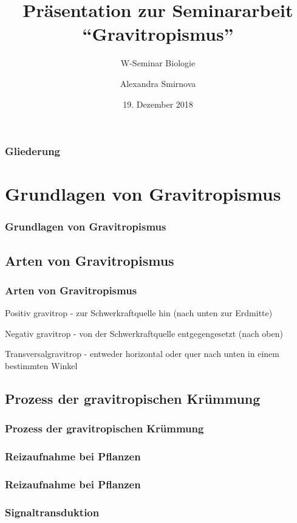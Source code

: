 \documentclass[aspectratio=169]{beamer}
\author{Alexandra Smirnova}
\title{Präsentation zur Seminararbeit \hyphenquote{ngerman}{Gravitropismus}}
\subtitle{W-Seminar Biologie}
\date{19. Dezember 2018}
\begin{document}
	\maketitle
	
	\begin{frame}
		\frametitle{Gliederung}
		\tableofcontents
	\end{frame}
	
	\section{Grundlagen von Gravitropismus}

	
	\begin{frame}
		\frametitle{Grundlagen von Gravitropismus}
	\end{frame}
	
	\subsection{Arten von Gravitropismus}
	
	\begin{frame}
		\frametitle{Arten von Gravitropismus}
		Positiv gravitrop - zur Schwerkraftquelle hin (nach unten zur Erdmitte)
		
		Negativ gravitrop - von der Schwerkraftquelle entgegengesetzt (nach oben)
		
		Transversalgravitrop - entweder horizontal oder quer nach unten in einem bestimmten Winkel 
		
	\end{frame}
	
	\subsection{Prozess der gravitropischen Krümmung}
	
	\begin{frame}
		\frametitle{Prozess der gravitropischen Krümmung}
	\end{frame}
		
	\subsubsection{Reizaufnahme bei Pflanzen}
		
	\begin{frame}
		\frametitle{Reizaufnahme bei Pflanzen}
	\end{frame}
			
	\subsubsection{Signaltransduktion}
		
\end{document}
